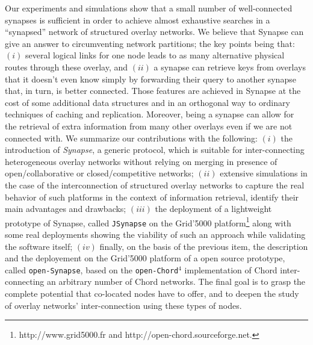 
Our experiments and simulations show that a small number of
well-connected sy\-napses is sufficient in order to achieve almost
exhaustive searches in a ``synapsed'' network of structured overlay
networks. We believe that Synapse can give an answer to circumventing
network partitions; the key points being that:
%
$(i)$ several logical links for one node leads to as many alternative
physical routes through these overlay, and
$(ii)$ a synapse can retrieve keys from overlays that it doesn't even know
simply by forwarding their query to another synapse that, in turn, is
better connected.
%
Those features are achieved in Synapse at the cost of some additional
data structures and in an orthogonal way to ordinary techniques of
caching and replication.  Moreover, being a synapse can allow for the
retrieval of extra information from many other overlays even if we are
not connected with.  We summarize our contributions with the
following:
%
%
$(i)$ the introduction of \emph{Synapse}, a generic protocol, which is
suitable for inter-connecting heterogeneous overlay networks without
relying on merging in presence of open/collaborative or
closed/competitive networks;
%
$(ii)$ extensive simulations in the case of the interconnection of
structured overlay networks to capture the real behavior of such
platforms in the context of information retrieval, identify their main
advantages and drawbacks;
%
$(iii)$ the deployment of a lightweight prototype of Synapse, called
\texttt{JSynapse} on the Grid'5000 platform\footnote{{\sf
    http://www.grid5000.fr} and {\sf
    http://open-chord.sourceforge.net}.} along with some real
deployments showing the viability of such an approach while validating
the software itself;
%
$(iv)$ finally, on the basis of the previous item, the description and
the deployement on the Grid'5000 platform of a open source prototype,
called \texttt{open-Synapse}, based on the \texttt{open-Chord}$^4$
implementation of Chord
  inter-connecting an arbitrary number of Chord networks.
%
The final goal is to grasp the complete potential that co-located
nodes have to offer, and to deepen the study of overlay networks'
inter-connection using these types of nodes.

